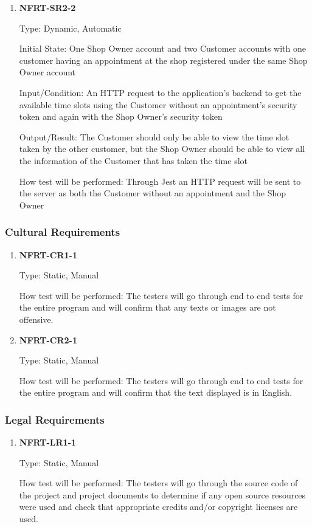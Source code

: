 \documentclass[12pt, titlepage]{article}
\begin{document}
\begin{enumerate}
	\item \textbf{NFRT-SR2-2}

	      Type: Dynamic, Automatic

	      Initial State: One Shop Owner account and two Customer accounts with one customer having an
	      appointment at the shop registered under the same Shop Owner account

	      Input/Condition: An HTTP request to the application's backend to get the available time slots using
	      the Customer without an appointment's security token and again with the Shop Owner's security token

	      Output/Result: The Customer should only be able to view the time slot taken by the other customer,
	      but the Shop Owner should be able to view all the information of the Customer that has taken the
	      time slot

	      How test will be performed: Through Jest an HTTP request will be sent to the server as both the
	      Customer without an appointment and the Shop Owner

\end{enumerate}

\subsubsection{Cultural Requirements}
\begin{enumerate}
	\item \textbf{NFRT-CR1-1}

	      Type: Static, Manual

	      How test will be performed: The testers will go through end to end tests for the entire program and
	      will confirm that any texts or images are not offensive.

	\item \textbf{NFRT-CR2-1}

	      Type: Static, Manual

	      How test will be performed: The testers will go through end to end tests for the entire program and
	      will confirm that the text displayed is in English.

\end{enumerate}

\subsubsection{Legal Requirements}
\begin{enumerate}
	\item \textbf{NFRT-LR1-1}

	      Type: Static, Manual

	      How test will be performed: The testers will go through the source code of the project and project
	      documents to determine if any open source resources were used and check that appropriate credits
	      and/or copyright licenses are used.

\end{enumerate}
\end{document}
